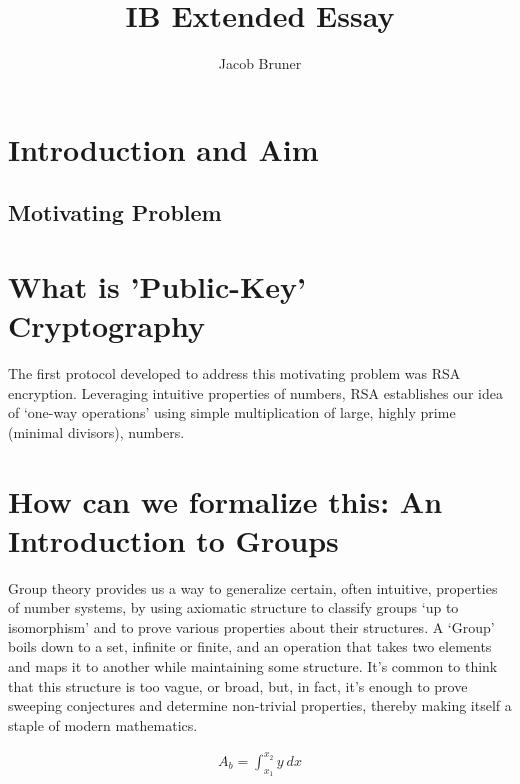\documentclass[11pt,a4paper]{article}
\author{Jacob Bruner}
\title{IB Extended Essay}
\begin{document}
\maketitle
\tableofcontents

\pagebreak

\iffalse
############
heres an example of a code block
\begin{lstlisting}
        def intervalValues(z, n):
            return output # return the sequence of values
\end{lstlisting}

heres an example of an image
\begin{figure}[h]
\begin{center}
\texttt{[image: onefifteen]} 
\caption{Sequences Generated by n = 1-15 on Argand Diagram}
\end{center}
\end{figure}
############
\fi

\section{Introduction and Aim}
\subsection{Motivating Problem}



\section{What is 'Public-Key' Cryptography}
The first protocol developed to address this motivating problem was RSA encryption. Leveraging intuitive properties of numbers, RSA establishes our idea of ‘one-way operations’ using simple multiplication of large, highly prime (minimal divisors), numbers. 

\section{How can we formalize this: An Introduction to Groups}
Group theory provides us a way to generalize certain, often intuitive, properties of number systems, by using axiomatic structure to classify groups ‘up to isomorphism’ and to prove various properties about their structures. A ‘Group’ boils down to a set, infinite or finite, and an operation that takes two elements and maps it to another while maintaining some structure. It’s common to think that this structure is too vague, or broad, but, in fact, it’s enough to prove sweeping conjectures and determine non-trivial properties, thereby making itself a staple of modern mathematics.

\begin{align*}
  A_b = \int_{x_1}^{x_2} y\ dx
  \end{align*}
\end{document}
